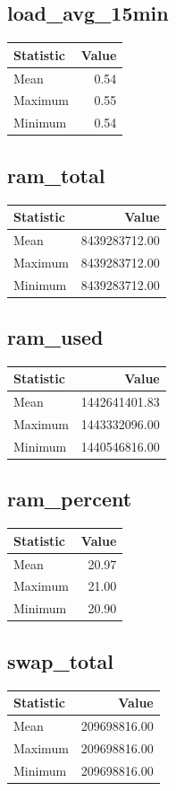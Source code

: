 \documentclass[11pt]{article}
\begin{document}
\subsection{load_avg_15min}
\begin{tabular}{lr}
\toprule
Statistic & Value \\
\midrule
Mean & 0.54 \\
Maximum & 0.55 \\
Minimum & 0.54 \\
\bottomrule
\end{tabular}


\subsection{ram_total}
\begin{tabular}{lr}
\toprule
Statistic & Value \\
\midrule
Mean & 8439283712.00 \\
Maximum & 8439283712.00 \\
Minimum & 8439283712.00 \\
\bottomrule
\end{tabular}


\subsection{ram_used}
\begin{tabular}{lr}
\toprule
Statistic & Value \\
\midrule
Mean & 1442641401.83 \\
Maximum & 1443332096.00 \\
Minimum & 1440546816.00 \\
\bottomrule
\end{tabular}


\subsection{ram_percent}
\begin{tabular}{lr}
\toprule
Statistic & Value \\
\midrule
Mean & 20.97 \\
Maximum & 21.00 \\
Minimum & 20.90 \\
\bottomrule
\end{tabular}


\subsection{swap_total}
\begin{tabular}{lr}
\toprule
Statistic & Value \\
\midrule
Mean & 209698816.00 \\
Maximum & 209698816.00 \\
Minimum & 209698816.00 \\
\bottomrule
\end{tabular}
\end{document}
